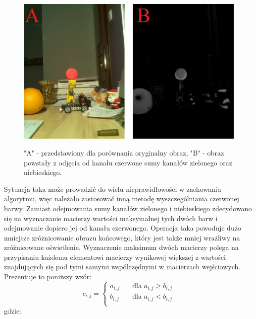 \begin{figure}[H]
\begin{center}
\includegraphics[scale=0.42]{imgs/imgBase+sumBG.jpg}
\caption[Kanał czerwony minus zielony oraz niebieski.]\small{"A" - przedstawiony dla porównania oryginalny obraz, "B" - obraz powstały z odjęcia od kanału czerwone sumy kanałów zielonego oraz niebieskiego.}
\label{red-b+g}
\end{center}
\end{figure}
Sytuacja taka może prowadzić do wielu nieprawidłowości w zachowaniu algorytmu, więc należało zastosować inną metodę wyszczególniania czerwonej barwy. Zamiast odejmowania sumy kanałów zielonego i niebieskiego zdecydowano się na wyznaczanie macierzy wartości maksymalnej tych dwóch barw i odejmowanie dopiero jej od kanału czerwonego. Operacja taka powoduje dużo mniejsze zróżnicowanie obrazu końcowego, który jest także mniej wrażliwy na zróżnicowane oświetlenie. Wyznaczenie maksimum dwóch macierzy polega na przypisaniu każdemu elementowi macierzy wynikowej większej z wartości znajdujących się pod tymi samymi współrzędnymi w macierzach wejściowych. Prezentuje to poniższy wzór:
\begin{equation}
c_{i,j} =
  \begin{cases}
    a_{i,j}	& \quad \text{dla } a_{i,j} \geq b_{i,j}\\
    b_{i,j}	& \quad \text{dla } a_{i,j} < b_{i,j}\\
  \end{cases}
\label{eq:progowanie}
\end{equation}
gdzie:
\begin{equationDescriptor}
\end{equationDescriptor}
